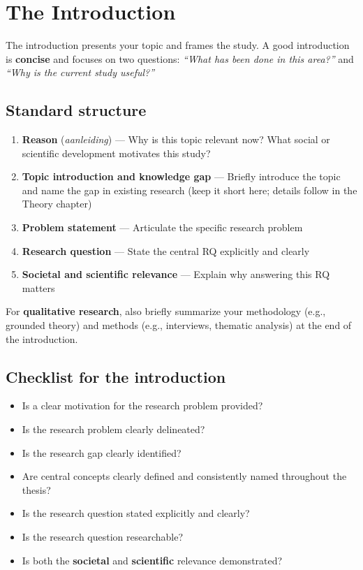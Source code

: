 \documentclass[
  11pt,
  a4paper,
]{scrbook}
\providecommand{\tightlist}{%
  \setlength{\itemsep}{0pt}\setlength{\parskip}{0pt}}\usepackage{longtable,booktabs,array}
\begin{document}
\section{The Introduction}\label{the-introduction}

The introduction presents your topic and frames the study. A good
introduction is \textbf{concise} and focuses on two questions:
\emph{``What has been done in this area?''} and \emph{``Why is the
current study useful?''}

\subsection{Standard structure}\label{standard-structure}

\begin{enumerate}
\def\labelenumi{\arabic{enumi}.}
\tightlist
\item
  \textbf{Reason} (\emph{aanleiding}) --- Why is this topic relevant
  now? What social or scientific development motivates this study?
\item
  \textbf{Topic introduction and knowledge gap} --- Briefly introduce
  the topic and name the gap in existing research (keep it short here;
  details follow in the Theory chapter)
\item
  \textbf{Problem statement} --- Articulate the specific research
  problem
\item
  \textbf{Research question} --- State the central RQ explicitly and
  clearly
\item
  \textbf{Societal and scientific relevance} --- Explain why answering
  this RQ matters
\end{enumerate}

For \textbf{qualitative research}, also briefly summarize your
methodology (e.g., grounded theory) and methods (e.g., interviews,
thematic analysis) at the end of the introduction.

\subsection{Checklist for the
introduction}\label{checklist-for-the-introduction}

\begin{itemize}
\tightlist
\item[$\square$]
  Is a clear motivation for the research problem provided?
\item[$\square$]
  Is the research problem clearly delineated?
\item[$\square$]
  Is the research gap clearly identified?
\item[$\square$]
  Are central concepts clearly defined and consistently named throughout
  the thesis?
\item[$\square$]
  Is the research question stated explicitly and clearly?
\item[$\square$]
  Is the research question researchable?
\item[$\square$]
  Is both the \textbf{societal} and \textbf{scientific} relevance
  demonstrated?
\end{itemize}
\end{document}
